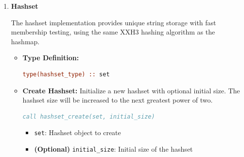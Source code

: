 \documentclass[11pt]{article}
\begin{document}
\begin{enumerate}
\begin{enumerate}
	      	      \textbf{Hashmap Usage Example:}
	      	      \begin{lstlisting}[language=Fortran]
use xxh3_hashmap_module

type(hashmap_type) :: gene_map
integer :: gene_index

! Create hashmap for gene IDs
call hashmap_create(gene_map, initial_size=1000)

! Store gene indices
call hashmap_put(gene_map, "Gene_001", 1)
call hashmap_put(gene_map, "Gene_002", 2)
call hashmap_put(gene_map, "Gene_003", 3)

! Lookup gene index
gene_index = hashmap_get(gene_map, "Gene_002")
! gene_index = 2

! Clean up
call hashmap_destroy(gene_map)
	      	      \end{lstlisting}
	      	      
	      	\item \textbf{Hashset}
	      	      
	      	      The hashset implementation provides unique string storage with fast membership
	      	      testing, using the same XXH3 hashing algorithm as the hashmap.
	      	      
	      	      \begin{itemize}
	      	      	\item \textbf{Type Definition:}
	      	      	      \begin{lstlisting}[language=Fortran]
type(hashset_type) :: set
	      	      	      \end{lstlisting}
	      	      	      
	      	      	\item \textbf{Create Hashset:} Initialize a new hashset with
	      	      	      optional initial size. The hashset size will be increased to the next
	      	      	      greatest power of two.
	      	      	      \begin{lstlisting}[language=Fortran]
call hashset_create(set, initial_size)
	      	      	      \end{lstlisting}
	      	      	      \begin{itemize}
	      	      	      	\item \texttt{set}: Hashset object to create
	      	      	      	      
	      	      	      	\item \textbf{(Optional)} \texttt{initial\_size}: Initial size
	      	      	      	      of the hashset
	      	      	      \end{itemize}
	      	      	      

\end{itemize}
\end{enumerate}
\end{enumerate}
\end{document}
